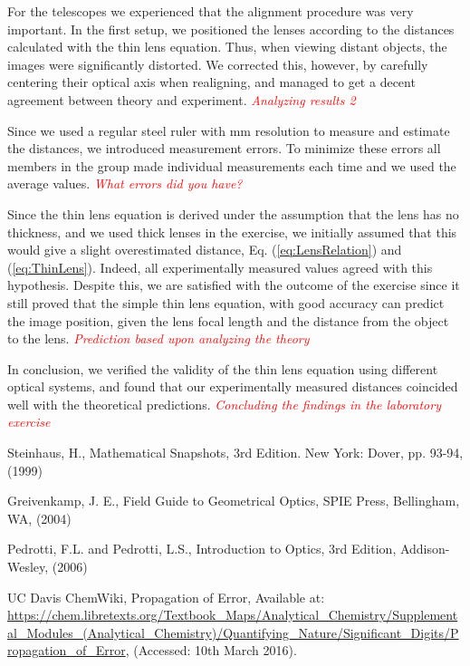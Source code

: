 \documentclass[fleqn,10pt]{SelfArx} %
\begin{document}
For the telescopes we experienced that the alignment procedure was very important. In the first setup, we positioned the lenses according to the distances calculated with the thin lens equation. Thus, when viewing distant objects, the images were significantly distorted. We corrected this, however, by carefully centering their optical axis when realigning, and managed to get a decent agreement between theory and experiment. \textcolor{red}{\textit{Analyzing results 2}}

Since we used a regular steel ruler with mm resolution to measure and estimate the distances, we introduced measurement errors. To minimize these errors all members in the group made individual measurements each time and we used the average values. \textcolor{red}{\textit{What errors did you have?}} 

Since the thin lens equation is derived under the assumption that the lens has no thickness, and we used thick lenses in the exercise, we initially assumed that this would give a slight overestimated distance, Eq. (\ref{eq:LensRelation}) and (\ref{eq:ThinLens}). Indeed, all experimentally measured values agreed with this hypothesis. Despite this, we are satisfied with the outcome of the exercise since it still proved that the simple thin lens equation, with good accuracy can predict the image position, given the lens focal length and the distance from the object to the lens. \textcolor{red}{\textit{Prediction based upon analyzing the theory}}

In conclusion, we verified the validity of the thin lens equation using different optical systems, and found that our experimentally measured distances coincided well with the theoretical predictions. \textcolor{red}{\textit{Concluding the findings in the laboratory exercise}}



\begin{thebibliography}{4}
    Steinhaus, H.,
    Mathematical Snapshots,
    3rd Edition. New York: Dover, pp. 93-94,
    (1999)

    Greivenkamp,
    J. E., Field Guide to Geometrical Optics,
    SPIE Press,
    Bellingham, WA,
    (2004)

    Pedrotti, F.L. and Pedrotti, L.S.,
    Introduction to Optics,
    3rd Edition,
    Addison-Wesley,
    (2006)

    UC Davis ChemWiki,
    Propagation of Error,
    Available at: \url{https://chem.libretexts.org/Textbook_Maps/Analytical_Chemistry/Supplemental_Modules_(Analytical_Chemistry)/Quantifying_Nature/Significant_Digits/Propagation_of_Error},
    (Accessed: 10th March 2016).
\end{thebibliography}
\end{document}
